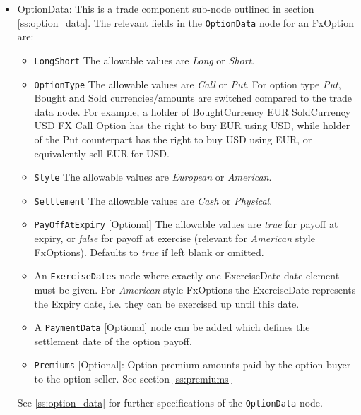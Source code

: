\begin{itemize}
\item OptionData: This is a trade component sub-node outlined in section \ref{ss:option_data}. 
The relevant fields in the \lstinline!OptionData! node for an FxOption are:

\begin{itemize}
\item \lstinline!LongShort! The allowable values are \emph{Long} or \emph{Short}.

\item \lstinline!OptionType! The allowable values are \emph{Call} or \emph{Put}. For option type \emph{Put}, Bought and Sold currencies/amounts are switched compared to the trade data node.
For example, a holder of BoughtCurrency EUR SoldCurrency USD FX Call Option has the right to buy EUR using USD, while
holder of the Put counterpart has the right to buy USD using EUR, or equivalently sell EUR for USD.

\item  \lstinline!Style! The allowable values are \emph{European} or \emph{American}.

\item  \lstinline!Settlement! The allowable values are \emph{Cash} or \emph{Physical}.

\item \lstinline!PayOffAtExpiry! [Optional] The allowable values are \emph{true} for payoff at expiry, or \emph{false} for payoff at exercise (relevant for \emph{American} style FxOptions). Defaults to \emph{true} if left blank or omitted.

\item An \lstinline!ExerciseDates! node where exactly one ExerciseDate date element must be given. For \emph{American} style FxOptions the ExerciseDate represents the Expiry date, i.e. they can be exercised up until this date. \\

\item A \lstinline!PaymentData! [Optional] node can be added which defines the settlement date of the option payoff.

\item \lstinline!Premiums! [Optional]: Option premium amounts paid by the option buyer to the option seller. See section \ref{ss:premiums}


\end{itemize}

 See \ref{ss:option_data} for further specifications of the \lstinline!OptionData! node.



\end{itemize}
